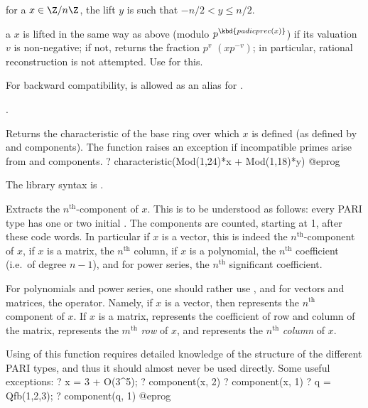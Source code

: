 \item for a  $x\in \Z/n\Z$, the lift $y$ is such that
$-n/2<y\le n/2$.

\item  a  $x$ is lifted in the same way as above (modulo
$p^\kbd{padicprec(x)}$) if its valuation $v$ is non-negative; if not, returns
the fraction $p^v$ $(x p^{-v})$; in particular, rational
reconstruction is not attempted. Use  for this.

For backward compatibility,  is allowed as an alias
for .

.

\label{se:characteristic}
Returns the characteristic of the base ring over which $x$ is defined (as
defined by  and  components). The function raises an
exception if incompatible primes arise from  and 
components.
\bprog
? characteristic(Mod(1,24)*x + Mod(1,18)*y)
@eprog

The library syntax is .

\label{se:component}
Extracts the $n^{\text{th}}$-component of $x$. This is to be understood
as follows: every PARI type has one or two initial . The
components are counted, starting at 1, after these code words. In particular
if $x$ is a vector, this is indeed the $n^{\text{th}}$-component of $x$, if
$x$ is a matrix, the $n^{\text{th}}$ column, if $x$ is a polynomial, the
$n^{\text{th}}$ coefficient (i.e.~of degree $n-1$), and for power series,
the $n^{\text{th}}$ significant coefficient.

For polynomials and power series, one should rather use , and
for vectors and matrices, the \kbd{[$\,$]} operator. Namely, if $x$ is a
vector, then  represents the $n^{\text{th}}$ component of $x$. If
$x$ is a matrix,  represents the coefficient of row  and
column  of the matrix,  represents the $m^{\text{th}}$
\emph{row} of $x$, and  represents the $n^{\text{th}}$
\emph{column} of $x$.

Using of this function requires detailed knowledge of the structure of the
different PARI types, and thus it should almost never be used directly.
Some useful exceptions:
\bprog
    ? x = 3 + O(3^5);
    ? component(x, 2)
    ? component(x, 1)
    ? q = Qfb(1,2,3);
    ? component(q, 1)
@eprog

